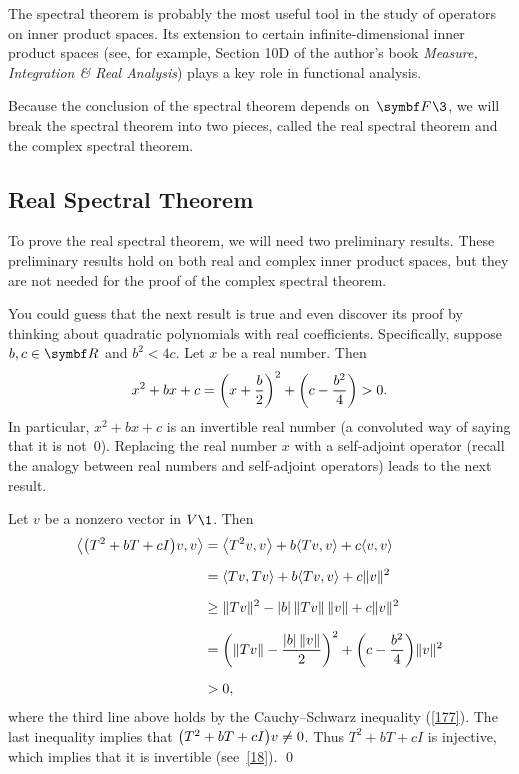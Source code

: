 The spectral theorem is probably the most useful tool in the study of operators on inner product spaces. Its extension to certain infinite-dimensional inner product spaces (see, for example, Section 10D of the author's book \textit{Measure, Integration \& Real Analysis}) plays a key role in functional analysis.

Because the conclusion of the spectral theorem depends on~$\F{}\3$, we will break the spectral theorem into two pieces, called the real spectral theorem and the complex spectral theorem.

\subsection{Real Spectral Theorem}

To prove the real spectral theorem, we will need two preliminary results. These preliminary results hold on both real and complex inner product spaces, but they are not needed for the proof of the complex spectral theorem.


You could guess that the next result is true and even discover its proof by thinking about quadratic polynomials with real coefficients.  Specifically,  suppose $b, c \in \R{}$ and $b^2 < 4 c$.  Let $x$ be a real  number. Then
\[
x^2 + b x + c =
\paren[\bigg]{x + \frac{b}{2}}^2 + \paren[\bigg]{c - \frac{b^2}{4}}
> 0.
\]
In particular, $x^2 + b x + c$ is an invertible real number (a convoluted
way of saying that it is not~0).  Replacing the real number $x$ with a
self-adjoint operator (recall the analogy between real numbers and
self-adjoint operators) leads to the next result.


\proof
Let $v$ be a nonzero vector in $V\1$.  Then
\begin{align*}
\ip[\big]{\paren[\big]{T^2 + b T + c I} v, v} &=
\ip[\big]{T^2 v, v} + b \ip{Tv, v} + c \ip{v,v} \\[6bp]
&= \ip{Tv,Tv} + b \ip{Tv, v}  + c \|v\|^2\\[6bp]
&\ge \|Tv\|^2 - |b| \, \|Tv\| \, \|v\|   + c \|v\|^2\\[6bp]
&= \paren[\bigg]{\|Tv\| - \frac{|b| \, \|v\|}{2}}^2 + \paren[\bigg]{c - \frac{b^2}{4}} \|v\|^2 \\[6bp]
& > 0,
\end{align*}
where the third line above holds by the Cauchy--Schwarz inequality (\ref{177}).
The last inequality implies that $\paren[\big]{T^2 + b T + c I} v \ne 0$.  Thus
$T^2 + b T + c I$ is injective, which implies that it is invertible (see~\ref{18}).
\qed

